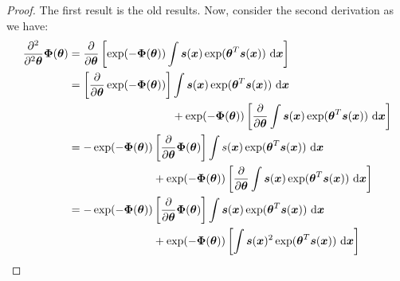 \begin{proof}
    The first result is the old results. Now, consider the second derivation as we have:
    \begin{equation*}
    \begin{aligned}
        \frac{\partial^2}{\partial^2 \boldsymbol \theta} \boldsymbol \Phi(\boldsymbol \theta) &= \frac{\partial}{\partial \boldsymbol \theta} \brackb{ \exp(-\boldsymbol \Phi(\boldsymbol \theta)) \int \boldsymbol s(\boldsymbol x)\exp(\boldsymbol \theta^T\boldsymbol s(\boldsymbol x))\dby \boldsymbol x } \\
        &=\begin{aligned}[t]
            \brackb{\frac{\partial}{\partial \boldsymbol \theta} \exp(-\boldsymbol \Phi(\boldsymbol \theta))} &\int \boldsymbol  s(\boldsymbol x)\exp(\boldsymbol \theta^T\boldsymbol s(\boldsymbol x))\dby \boldsymbol x \\
            &+ \exp(-\boldsymbol \Phi(\boldsymbol \theta))\brackb{ \frac{\partial}{\partial \boldsymbol \theta} \int \boldsymbol  s(\boldsymbol x)\exp(\boldsymbol \theta^T\boldsymbol s(\boldsymbol x))\dby \boldsymbol x } \\
        \end{aligned} \\
        &=\begin{aligned}[t]
            -\exp(-\boldsymbol \Phi(\boldsymbol \theta)) &\brackb{\frac{\partial}{\partial \boldsymbol \theta} \boldsymbol\Phi(\boldsymbol \theta) } \int s(\boldsymbol x)\exp(\boldsymbol \theta^T\boldsymbol s(\boldsymbol x))\dby \boldsymbol x \\
            &+ \exp(-\boldsymbol \Phi(\boldsymbol \theta))\brackb{ \frac{\partial}{\partial \boldsymbol \theta} \int \boldsymbol  s(\boldsymbol x)\exp(\boldsymbol \theta^T\boldsymbol s(\boldsymbol x))\dby \boldsymbol x } \\
        \end{aligned} \\
        &=\begin{aligned}[t]
            -\exp(-\boldsymbol \Phi(\boldsymbol \theta)) &\brackb{\frac{\partial}{\partial \boldsymbol \theta} \boldsymbol\Phi(\boldsymbol \theta) } \int \boldsymbol s(\boldsymbol x)\exp(\boldsymbol \theta^T\boldsymbol s(\boldsymbol x))\dby \boldsymbol x \\
            &+ \exp(-\boldsymbol \Phi(\boldsymbol \theta))\brackb{\int \boldsymbol s(\boldsymbol x)^2\exp(\boldsymbol \theta^T\boldsymbol s(\boldsymbol x))\dby \boldsymbol x } \\

\end{aligned}
\end{aligned}
\end{equation*}
\end{proof}
